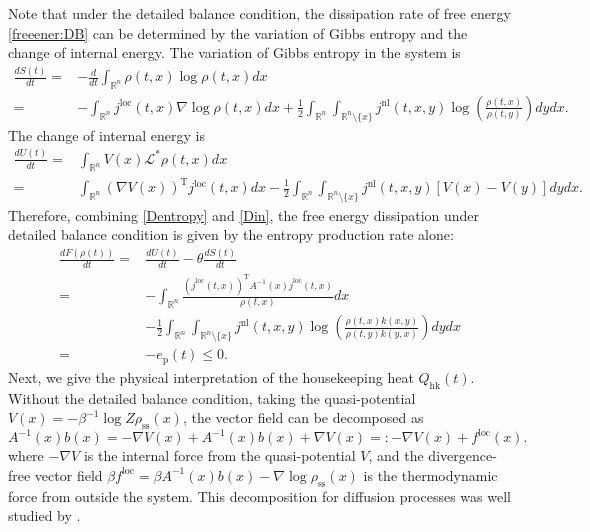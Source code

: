 \documentclass[10pt]{article}
\theoremstyle{definition}
\numberwithin{equation}{section}
\begin{document}
Note that under the detailed balance condition, the dissipation rate of free energy \eqref{freeener:DB} can be determined by the variation of Gibbs entropy and the change of internal energy. {\color{blue}The variation of Gibbs} entropy in the system is
\begin{align}\label{Dentropy}
   \frac{dS(t)}{dt}  = & -\frac{d}{dt} \int_{\mathbb{R}^n}\rho(t,x)\log \rho(t,x) dx \nonumber \\
                  = & -\int_{\mathbb{R}^n} j^\mathrm{loc}(t,x)\nabla \log \rho(t,x)dx  +\frac{1}{2} \int_{\mathbb{R}^n}\int_{\mathbb{R}^n \setminus \{x\}} j^\mathrm{nl}(t,x,y)\log \left( \frac{\rho(t,x)}{\rho(t,y)} \right) dydx.
\end{align}
The change of internal energy is 
\begin{align}\label{Din}
    \frac{d U(t)}{dt}
    = & \int_{\mathbb{R}^n} V(x) \mathcal{L}^{\ast} \rho(t,x)dx \nonumber\\
    = & \int_{\mathbb{R}^n} (\nabla V(x))^\mathrm{T} j^\mathrm{loc}(t,x)dx - \frac{1}{2}\int_{\mathbb{R}^n} \int_{\mathbb{R}^n \setminus \{x\}} j^\mathrm{nl}(t,x,y)  [V(x) - V(y)] dydx.
\end{align}
Therefore, combining \eqref{Dentropy} and \eqref{Din}, the free energy dissipation under detailed balance condition is given by the entropy production rate alone:
\begin{align*}
    \frac{dF(\rho(t))}{dt}
    = & \frac{dU(t)}{dt} - \theta \frac{dS(t)}{dt} \\
    = & -\int_{\mathbb{R}^n} \frac{(j^\mathrm{loc}(t,x))^\mathrm{T}A^{-1}(x)j^\mathrm{loc}(t,x)}{\rho(t,x)} dx \\
    & - \frac{1}{2} \int_{\mathbb{R}^n} \int_{\mathbb{R}^n \setminus \{x\}} j^\mathrm{nl}(t,x,y)\log \left( \frac{\rho(t,x)k(x,y)}{\rho(t,y)k(y,x)} \right) dydx\\
    = & - e_\mathrm{p}(t) \leq 0.
\end{align*}
Next, we give the physical interpretation of the housekeeping heat $Q_\mathrm{hk}(t)$.
Without the detailed balance condition, taking the quasi-potential $V(x) = -\beta^{-1}\log Z\rho_\mathrm{ss}(x)$, the vector field can be decomposed as 
\begin{equation*}
    A^{-1}(x)b(x) = -\nabla V(x) + A^{-1}(x)b(x) + \nabla V(x) =: - \nabla V(x) + f^\mathrm{loc}(x).
\end{equation*}
where $-\nabla V$ is the internal force from the quasi-potential $V$, and the divergence-free vector field $\beta f^\mathrm{loc}=\beta A^{-1}(x)b(x) - \nabla\log\rho_\mathrm{ss}(x)$ is the thermodynamic force from outside the system. This decomposition for diffusion processes was well studied by \cite{A04, Q13}.
\end{document}
